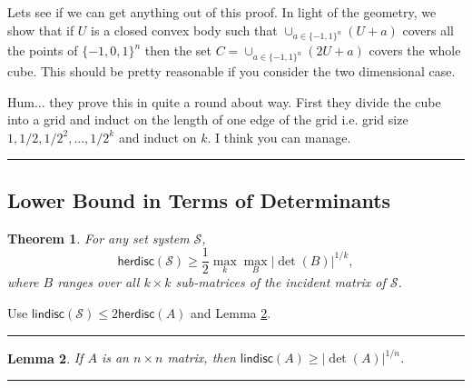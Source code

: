 \documentclass[twoside]{article}
\newcounter{lecnum}
\newtheorem{theorem}{Theorem}[lecnum]
\newtheorem{lemma}[theorem]{Lemma}
\newenvironment{proof}{{\bf Proof:}}{\hfill\rule{2mm}{2mm}}
\newcommand\SSet{\mathcal{S}}
\newcommand\herdisc{\mathsf{herdisc}}
\newcommand\lindisc{\mathsf{lindisc}}
\begin{document}
\begin{proof}
Lets see if we can get anything out of this proof. In light of the geometry, we show that if $U$ is a closed convex body such that $\cup_{a \in \{-1,1\}^n}(U + a)$ covers all the points of $\{-1, 0, 1\}^n$ then the set $C = \cup_{a\in \{-1,1\}^n}(2U + a)$ covers the whole cube. This should be pretty reasonable if you consider the two dimensional case. 

Hum... they prove this in quite a round about way. First they divide the cube into a grid and induct on the length of one edge of the grid i.e. grid size $1, 1/2, 1/2^2, ..., 1/2^k$ and induct on $k$. I think you can manage.   
\end{proof}

\subsection{Lower Bound in Terms of Determinants}
\begin{theorem}
\label{thm:herdisBDdet}
For any set system $\SSet$,
\[\herdisc(\SSet) \geq \frac{1}{2}\max_{k}\max_{B}|\det(B)|^{1/k},\]
where $B$ ranges over all $k \times k$ sub-matrices of the incident matrix of $\SSet$.
\end{theorem}
\begin{proof}
Use $\lindisc(\SSet) \leq 2\herdisc(A)$ and Lemma \ref{lem:lindisBDdet}.
\end{proof}

\begin{lemma}
\label{lem:lindisBDdet}
If $A$ is an $n \times n$ matrix, then $\lindisc(A) \geq |\det(A)|^{1/n}$. 
\end{lemma}
\begin{proof}

\end{proof}
\end{document}
